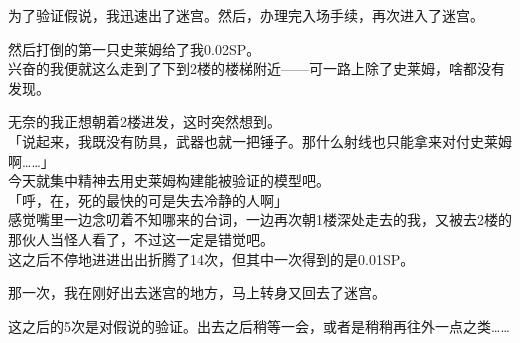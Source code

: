 为了验证假说，我迅速出了迷宫。然后，办理完入场手续，再次进入了迷宫。

然后打倒的第一只史莱姆给了我0.02SP。\\

兴奋的我便就这么走到了下到2楼的楼梯附近——可一路上除了史莱姆，啥都没有发现。

无奈的我正想朝着2楼进发，这时突然想到。\\

「说起来，我既没有防具，武器也就一把锤子。那什么射线也只能拿来对付史莱姆啊……」\\

今天就集中精神去用史莱姆构建能被验证的模型吧。\\

「呼，在，死的最快的可是失去冷静的人啊」\\

感觉嘴里一边念叨着不知哪来的台词，一边再次朝1楼深处走去的我，又被去2楼的那伙人当怪人看了，不过这一定是错觉吧。\\

这之后不停地进进出出折腾了14次，但其中一次得到的是0.01SP。

那一次，我在刚好出去迷宫的地方，马上转身又回去了迷宫。

这之后的5次是对假说的验证。出去之后稍等一会，或者是稍稍再往外一点之类……\\

